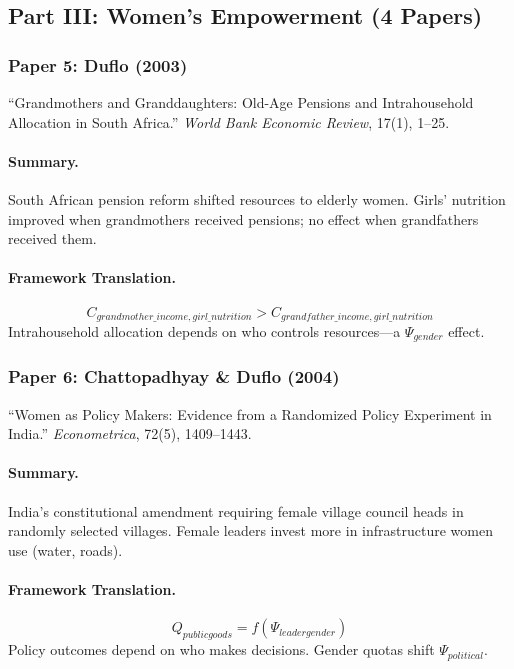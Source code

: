 \subsection{Part III: Women's Empowerment (4 Papers)}

\subsubsection{Paper 5: Duflo (2003)}

``Grandmothers and Granddaughters: Old-Age Pensions and Intrahousehold Allocation in South Africa.''
\textit{World Bank Economic Review}, 17(1), 1--25.

\paragraph{Summary.}
South African pension reform shifted resources to elderly women. Girls' nutrition
improved when grandmothers received pensions; no effect when grandfathers received them.

\paragraph{Framework Translation.}
\begin{equation}
  C_{grandmother\_income, girl\_nutrition} > C_{grandfather\_income, girl\_nutrition}
\end{equation}
Intrahousehold allocation depends on who controls resources---a $\Psi_{gender}$ effect.

\subsubsection{Paper 6: Chattopadhyay \& Duflo (2004)}

``Women as Policy Makers: Evidence from a Randomized Policy Experiment in India.''
\textit{Econometrica}, 72(5), 1409--1443.

\paragraph{Summary.}
India's constitutional amendment requiring female village council heads in randomly
selected villages. Female leaders invest more in infrastructure women use (water, roads).

\paragraph{Framework Translation.}
\begin{equation}
  Q_{public goods} = f(\Psi_{leader gender})
\end{equation}
Policy outcomes depend on who makes decisions. Gender quotas shift $\Psi_{political}$.

